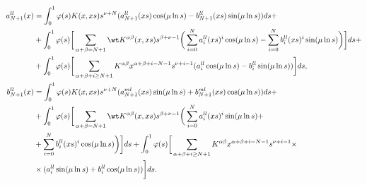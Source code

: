 \begin{align} 


a^{ll}_{N+1}(x)&=\int^1_0\varphi(s)K(x,xs)s^{\nu+N} 


(a^{ll}_{N+1}(xs)\cos(\mu\ln s)-b^{ll}_{N+1}(xs) 


\sin(\mu\ln s))ds +\notag \\ 


% 


&+\int^1_0\varphi(s)\bigg[\sum_{\alpha+\beta=N+1}\wt K 


{}^{\alpha\beta}(x,xs)s^{\beta+\nu-1}\bigg(\sum^N_{i=0} 


a^{ll}_i(xs)^i\cos(\mu\ln s)-\sum^N_{i=0}b^{ll}_i 


(xs)^i\sin(\mu\ln s)\bigg)\bigg]ds+\notag \\ 


% 


&+\int^1_0\varphi(s)\bigg[\sum_{\alpha+\beta+i\ge N+1} 


K^{\alpha\beta}x^{\alpha+\beta+i-N-1}s^{\nu+i-1} 


(a^{ll}_i\cos(\mu\ln s)-b^{ll}_i\sin(\mu\ln s))\bigg]ds,\notag\\ 


% 


b^{ll}_{N+1}(x)&=\int^1_0\varphi(s)K(x,xs)s^{\nu+N} 


(a^{ml}_{N+1}(xs)\sin(\mu\ln s)+b^{ml}_{N+1}(xs) 


\cos(\mu\ln s))ds + \\ 


% 


&+\int^1_0\varphi(s)\bigg[\sum_{\alpha+\beta=N+1}\wt K{}^{\alpha\beta} 


(x,xs)s^{\beta+\nu-1}\bigg(\sum^N_{i=0}a^{ll}_i(xs)^i 


\sin(\mu\ln s)+\notag \\ 


% 


&+\sum^N_{i=0}b^{ll}_i(xs)^i\cos(\mu\ln s)\bigg)\bigg]ds+ 


\int^1_0\varphi(s)\bigg[\sum_{\alpha+\beta+i\ge N+1} 


K^{\alpha\beta}x^{\alpha+\beta+i-N-1}s^{\nu+i-1}\times\notag\\ 


% 


&\times(a^{ll}_i\sin(\mu\ln s)+b^{ll}_i\cos(\mu\ln s)) 


\bigg]ds.\notag 


\end{align} 


